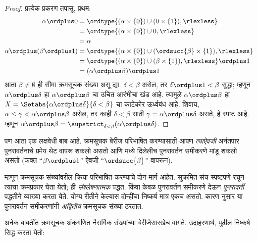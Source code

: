 \documentclass[../../../include/open-logic-section]{subfiles}
\begin{document}
\begin{proof}
प्रत्येक प्रकरण तपासू. प्रथम:
\begin{align*}
  \alpha \ordplus  0
  & = \ordtype{(\alpha \times \{0\}) \cup (0 \times \{1\}), \rlexless} \\
  &= \ordtype{(\alpha \times \{0\}) \cup 0, \rlexless}\\
  &= \alpha\\
  \alpha \ordplus (\beta \ordplus  1)
  &= \ordtype{(\alpha\times \{0\}) \cup (\ordsucc{\beta}\times \{1\}), \rlexless} \\
  &= \ordtype{(\alpha\times \{0\}) \cup (\beta \times \{1\}), \rlexless} \ordplus 1\\
  &= (\alpha \ordplus  \beta) \ordplus  1
\end{align*}
आता $\beta \neq \emptyset$ ही सीमा क्रमसूचक संख्या असू द्या. $\delta < \beta$ असेल, तर $\delta\ordplus 1 < \beta$ सुद्धा; म्हणून $\alpha \ordplus  \delta$ हा $\alpha \ordplus  \beta$ चा उचित आरंभीचा खंड आहे. त्यामुळे $\alpha
\ordplus  \beta$ हा $X = \Setabs{\alpha
\ordplus  \delta}{\delta < \beta}$ चा काटेकोर ऊर्ध्वबंध आहे. शिवाय, $\alpha \leq \gamma <
\alpha \ordplus  \beta$ असेल, तर काही $\delta < \beta$ साठी $\gamma = \alpha \ordplus
\delta$ असते, हे स्पष्ट आहे. म्हणून $\alpha \ordplus  \beta =
\supstrict_{\delta< \beta}(\alpha\ordplus \delta)$.
\end{proof}

पण आता एक लक्षवेधी बाब आहे. क्रमसूचक बेरीज परिभाषित करण्यासाठी आपण \emph{त्याऐवजी} अनंतपार पुनरावर्तनाचे प्रमेय थेट वापरू शकलो असतो आणि  मध्ये दिलेलीच पुनरावर्तन समीकरणे मांडू शकलो असतो (फक्त “$\beta \ordplus 1$” ऐवजी “$\ordsucc{\beta}$” वापरून).

म्हणून क्रमसूचक संख्यांवरील क्रिया परिभाषित करण्याचे दोन मार्ग आहेत. सुक्रमित संच स्पष्टपणे रचून त्याचा क्रमप्रकार घेता येतो; ही \emph{संश्लेषणात्मक} पद्धत. किंवा केवळ पुनरावर्तन समीकरणे देऊन \emph{पुनरावर्ती} पद्धतीने व्याख्या करता येते. योग्य रीतीने केल्यास दोन्हींचा निष्कर्ष मात्र एकच असतो. कारण  नुसार या पुनरावर्तन समीकरणांनी \emph{अद्वितीय} क्रमसूचक संख्या ठरतात.

अनेक बाबतींत क्रमसूचक अंकगणित नैसर्गिक संख्यांच्या बेरीजेसारखेच वागते. उदाहरणार्थ, पुढील निष्कर्ष सिद्ध करता येतो:
\end{document}
